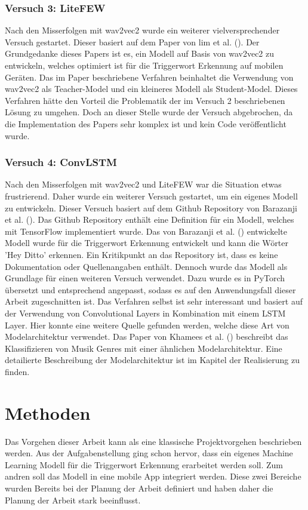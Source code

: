 \documentclass[11pt,a4paper]{article}
\begin{document}
\subsubsection{Versuch 3: LiteFEW}
Nach den Misserfolgen mit wav2vec2 wurde ein weiterer vielversprechender Versuch gestartet. Dieser 
basiert auf dem Paper von lim et al. (\cite{lim2023lightweight}). Der Grundgedanke dieses Papers 
ist es, ein Modell auf Basis von wav2vec2 zu entwickeln, welches optimiert ist für die Triggerwort 
Erkennung auf mobilen Geräten. Das im Paper beschriebene Verfahren beinhaltet die Verwendung von 
wav2vec2 als Teacher-Model und ein kleineres Modell als Student-Model. Dieses Verfahren hätte 
den Vorteil die Problematik der im Versuch 2 beschriebenen Lösung zu umgehen. Doch an dieser Stelle 
wurde der Versuch abgebrochen, da die Implementation des Papers sehr komplex ist und kein Code 
veröffentlicht wurde.

\subsubsection{Versuch 4: ConvLSTM}
Nach den Misserfolgen mit wav2vec2 und LiteFEW war die Situation etwas frustrierend. Daher wurde 
ein weiterer Versuch gestartet, um ein eigenes Modell zu entwickeln. Dieser Versuch basiert auf 
dem Github Repository von Barazanji et al. (\cite{barazanji2023heyditto}). Das Github Repository 
enthält eine Definition für ein Modell, welches mit TensorFlow implementiert wurde. Das von 
Barazanji et al. (\cite{barazanji2023heyditto}) entwickelte Modell wurde für die Triggerwort 
Erkennung entwickelt und kann die Wörter 'Hey Ditto' erkennen. Ein Kritikpunkt an das Repository 
ist, dass es keine Dokumentation oder Quellenangaben enthält. Dennoch wurde das Modell als 
Grundlage für einen weiteren Versuch verwendet. Dazu wurde es in PyTorch übersetzt und 
entsprechend angepasst, sodass es auf den Anwendungsfall dieser Arbeit zugeschnitten ist. 
Das Verfahren selbst ist sehr interessant und basiert auf der Verwendung von Convolutional Layers 
in Kombination mit einem LSTM Layer. Hier konnte eine weitere Quelle gefunden werden, welche 
diese Art von Modelarchitektur verwendet. Das Paper von Khamees et al. 
(\cite{khamees2021classifying}) beschreibt das Klassifizieren von Musik Genres mit einer 
ähnlichen Modelarchitektur. Eine detailierte Beschreibung der Modelarchitektur ist im Kapitel der 
Realisierung zu finden.

\newpage \section{Methoden}
Das Vorgehen dieser Arbeit kann als eine klassische Projektvorgehen beschrieben werden. Aus der 
Aufgabenstellung ging schon hervor, dass ein eigenes Machine Learning Modell für die Triggerwort 
Erkennung erarbeitet werden soll. Zum andren soll das Modell in eine mobile App integriert werden.
Diese zwei Bereiche wurden Bereits bei der Planung der Arbeit definiert und haben daher die 
Planung der Arbeit stark beeinflusst.
\end{document}
